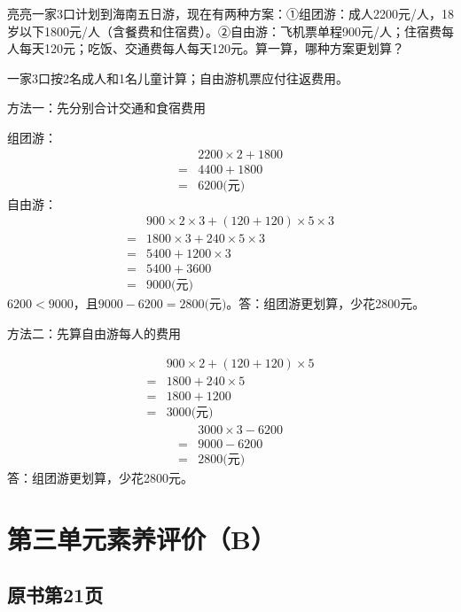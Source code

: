 亮亮一家3口计划到海南五日游，现在有两种方案：①组团游：成人2200元/人，18岁以下1800元/人（含餐费和住宿费）。②自由游：飞机票单程900元/人；住宿费每人每天120元；吃饭、交通费每人每天120元。算一算，哪种方案更划算？\par
\begin{BookAnswer}
一家3口按2名成人和1名儿童计算；自由游机票应付往返费用。\par 方法一：先分别合计交通和食宿费用\par 组团游：\[\begin{aligned} &2200\times2+1800\\={}&4400+1800\\={}&6200\text{(元)}\end{aligned}\]自由游：\[\begin{aligned} &900\times2\times3+(120+120)\times5\times3\\={}&1800\times3+240\times5\times3\\={}&5400+1200\times3\\={}&5400+3600\\={}&9000\text{(元)}\end{aligned}\]\(6200<9000\)，且\(9000-6200=2800\text{(元)}\)。答：组团游更划算，少花2800元。\par 方法二：先算自由游每人的费用\par \[\begin{aligned} &900\times2+(120+120)\times5\\={}&1800+240\times5\\={}&1800+1200\\={}&3000\text{(元)}\end{aligned}\]\[\begin{aligned} &3000\times3-6200\\={}&9000-6200\\={}&2800\text{(元)}\end{aligned}\]答：组团游更划算，少花2800元。
\end{BookAnswer}


\section{第三单元素养评价（B）}



\subsection*{原书第21页}

